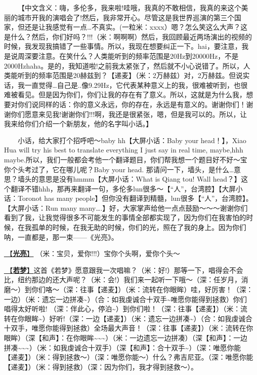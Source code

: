 \documentclass[]{ctexbook}
\begin{document}
  【中文含义：嗨，多伦多，我来啦!哇哦，我真的不敢相信，我真的来这个美丽的城市开我的演唱会了!然后，我非常开心。尽管这是我世界巡演的第三个国家，但还是让我感觉有一点\ldots 不真实。(一粒米：xxxx）嗯？怎么笑这么大声？这是什么？然后，你们好吗？!!!（米：啊啊啊）然后，我回顾最近两场演出的视频的时候，我发现我搞错了一些事情。所以，我现在想要纠正一下。hai，要注意，我是说周深要注意。在笑什么？人类能听到的频率范围是20Hz到20000Hz，不是2000Hzhaha。是的，我知道啦!之前我太紧张了，然后就不小心说错了。所以，人类能听到的频率范围是20赫兹到？【递麦】（米：2万赫兹）对，2万赫兹。但说实话，我一直觉得\ldots 自己是..像9.29Hz，它代表某种意义上的我，很难被听到，也很难被看见。但是因为你们，你们让我的存在有了意义。所以，这就是为什么我，想要对你们说同样的话：你的意义永远，你的存在，永远是有意义的。谢谢你们！谢谢你们愿意来见我!谢谢你们!!!啊，我还是很紧张，嗯，但是我可以的。所以，让我来给你们介绍一个新朋友，他的名字叫小话。】

  小话，给大家打个招呼吧～baby hh【大屏小话：Baby your head！】，Xiao Hua will try his best to translate everything I just say in real time, maybe,hhh maybe.所以，我们一般都会考他一个翻译题目，你们帮我想一个题目好不好～宝你个头考过了，它在哪儿呢？Baby your head. 那请问一下，墙头，是什么\ldots 意思？墙头的意思是没有hmmm【大屏小话：What is Qiang tou! Wall head？】这个翻译不错hhh，那再来翻译一句，多伦多lun很多～【``人''，台湾腔】【大屏小话：Toronot has many people】但你没有翻译到精髓，lun很多【``人''，台湾腔】。【大屏小话：Run many many\ldots.】好，大家掌声给他一点点鼓励～～～谢谢你们看到了我，让我觉得很多不可能发生的事情全部都实现了，因为你们在我害怕的时候，在我孤单的时候，在我无助的时候，你们的光，照在了我的身上。因为你们呐，一直都是，那一束------《光亮》。

\hyperref[silver-linings]{🎵【\textbf{光亮}】} （米：宝贝，爱你!!!）宝你个头啊，爱你个头～

\hyperref[ruomeng]{🎵【\textbf{若梦}】}这首《若梦》愿意跟我一次唱嘛？（米：好!）那等一下，唱得会不会比，纽约那边的还大声呢？（米：会!）我们来一起听一下哦～（深：任岁月，消磨～）到你们咯～（深：往事【递麦】）（米：流转在你眼眸）哇，好厉害！（深：一边）（米：遗忘一边拼凑\textasciitilde）（合：如我虔诚合十双手\textasciitilde 唯愿你能得到拯救）你们唱得太好听啦!
（深：伴此心，停泊\textasciitilde）到你们啦！（深：往事【递麦】）（米：流转在你眼眸\textasciitilde）好听!（深：一边【递麦】）（米：遗忘一边拼凑\textasciitilde）（合：如我虔诚合十双手，唯愿你能得到拯救）全场最大声音！（深：往事【递麦】）（米：流转在你眼眸）（深【和声】：在你眼眸\textasciitilde\textasciitilde\textasciitilde）（米：一边遗忘一边拼凑）（深【和声】：一边拼凑\textasciitilde\textasciitilde\textasciitilde）（米：如我虔诚合十双手）（深【和声】：合十双手\textasciitilde）（深：唯愿你能【递麦】）（米：得到拯救～）（深：唯愿你能～）什么？弗吉尼亚。（深：唯愿你能【递麦】）（米：得到拯救）（深：因为你们，我才得到拯救～）。
\end{document}
